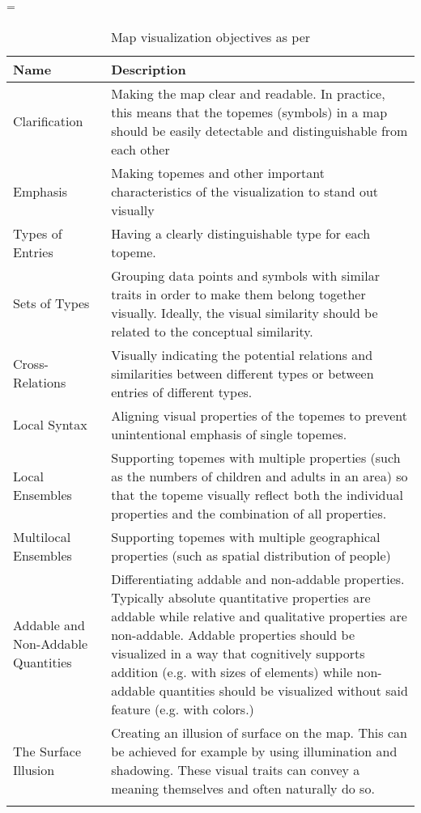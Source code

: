 \LTcapwidth=\textwidth
\begin{longtable}{|p{3cm}|p{10cm}|}
\hline
\textbf{Name} & \textbf{Description} \\ 
\hline
Clarification & Making the map clear and readable. In practice, this means that the topemes (symbols) in a map should be easily detectable and distinguishable from each other \\
\hline
Emphasis & Making topemes and other important characteristics of the visualization to stand out visually \\
\hline
Types of Entries & Having a clearly distinguishable type for each topeme. \\
\hline
Sets of Types & Grouping data points and symbols with similar traits in order to make them belong together visually. Ideally, the visual similarity should be related to the conceptual similarity. \\
\hline
Cross-Relations & Visually indicating the potential relations and similarities between different types or between entries of different types. \\
\hline
Local Syntax & Aligning visual properties of the topemes to prevent unintentional emphasis of single topemes. \\
\hline
Local Ensembles & Supporting topemes with multiple properties (such as the numbers of children and adults in an area) so that the topeme visually reflect both the individual properties and the combination of all properties. \\
\hline
Multilocal Ensembles & Supporting topemes with multiple geographical properties (such as spatial distribution of people)  \\
\hline
Addable and Non-Addable Quantities & Differentiating addable and non-addable properties. Typically absolute quantitative properties are addable while relative and qualitative properties are non-addable. Addable properties should be visualized in a way that cognitively supports addition (e.g. with sizes of elements) while non-addable quantities should be visualized without said feature (e.g. with colors.) \\
\hline
The Surface Illusion & Creating an illusion of surface on the map. This can be achieved for example by using illumination and shadowing. These visual traits can convey a meaning themselves and often naturally do so. \\
\hline
\caption{Map visualization objectives as per \citet{schlichtmann_visualization_2002}}
\end{longtable}

